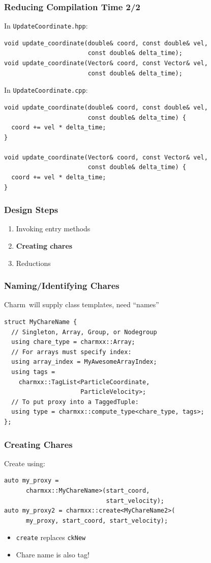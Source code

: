 \documentclass[svgnames,tikz,serif,ragged2e]{beamer}
\newcommand\Charm{Charm\nolinebreak[4]\hspace{-.05em}\raisebox{.4ex}{\relsize{-3}{\textbf{++}}}}
\begin{document}
\begin{frame}[fragile]
  \frametitle{Reducing Compilation Time 2/2}
    In \texttt{UpdateCoordinate.hpp}:
\begin{lstlisting}
void update_coordinate(double& coord, const double& vel,
                       const double& delta_time);
void update_coordinate(Vector& coord, const Vector& vel,
                       const double& delta_time);
\end{lstlisting}
  In \texttt{UpdateCoordinate.cpp}:
\begin{lstlisting}
void update_coordinate(double& coord, const double& vel,
                       const double& delta_time) {
  coord += vel * delta_time;
}

void update_coordinate(Vector& coord, const Vector& vel,
                       const double& delta_time) {
  coord += vel * delta_time;
}
\end{lstlisting}
\end{frame}

\begin{frame}[noframenumbering]
  \frametitle{Design Steps}
  \begin{enumerate}
  \item Invoking entry methods
  \item \textbf{Creating chares}
  \item Reductions
  \end{enumerate}
\end{frame}

\begin{frame}
  \frametitle{Naming/Identifying Chares}
  \Charm~will supply class templates, need ``names''
\begin{lstlisting}
struct MyChareName {
  // Singleton, Array, Group, or Nodegroup
  using chare_type = charmxx::Array;
  // For arrays must specify index:
  using array_index = MyAwesomeArrayIndex;
  using tags =
    charmxx::TagList<ParticleCoordinate,
                     ParticleVelocity>;
  // To put proxy into a TaggedTuple:
  using type = charmxx::compute_type<chare_type, tags>;
};
\end{lstlisting}
\end{frame}

\begin{frame}
  \frametitle{Creating Chares}
  Create using:
\begin{lstlisting}
auto my_proxy =
      charmxx::MyChareName>(start_coord,
                            start_velocity);
auto my_proxy2 = charmxx::create<MyChareName2>(
      my_proxy, start_coord, start_velocity);
\end{lstlisting}
  \begin{itemize}
  \item \texttt{create} replaces \texttt{ckNew}
  \item Chare name is also tag!
  \end{itemize}
\end{frame}
\end{document}
